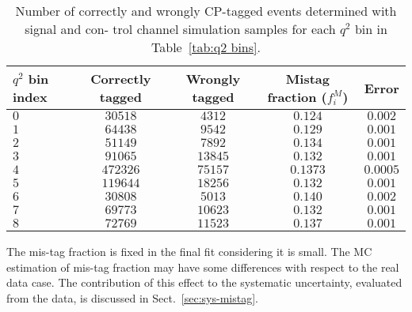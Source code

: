 \begin{table*}[!htb]
    \begin{center}
        \begin{small}
            \caption{Number of correctly and wrongly CP-tagged events determined with signal and con-
                trol channel simulation samples for each $q^2$ bin in Table~\ref{tab:q2 bins}.
                \label{tab:Mis tag fraction}}
            \begin{tabular}{|l|c|c|c|c|}
                \hline
                $q^2$ bin index  & Correctly tagged &  Wrongly tagged   & Mistag fraction ($f^M_i$)  &   Error  \\
                \hline
                $ 0$    &  $ 30518 $      &  $ 4312 $  & $ 0.124 $ & $ 0.002 $    \\
                $ 1 $   &  $ 64438$       &  $9542$    & $ 0.129 $ & $ 0.001 $\\
                $ 2$    &  $ 51149 $      &  $7892$    & $ 0.134 $ & $ 0.001 $ \\
                $3 $    &  $ 91065$       &  $13845$   & $ 0.132 $ & $ 0.001 $   \\
                $4  $   &   $ 472326$     &  $75157$   & $0.1373 $ & $ 0.0005$ \\
                $ 5 $   &  $119644 $      &  $18256$   & $0.132  $ & $ 0.001 $\\
                $ 6$    &  $30808$        &  $5013 $   & $0.140 $  & $ 0.002$\\
                $ 7 $   &  $69773$        &  $10623$   & $0.132 $  & $ 0.001$\\
                $ 8 $   &  $72769$        &  $11523$   & $0.137$   & $0.001$\\
                \hline
            \end{tabular}
        \end{small}
    \end{center}
\end{table*}

The mis-tag fraction is fixed in the final fit considering it is small.
The MC estimation of mis-tag fraction may have some differences with respect to the real data case.
The contribution of this effect to the systematic uncertainty, evaluated from the data, is discussed in Sect.~\ref{sec:sys-mistag}.




